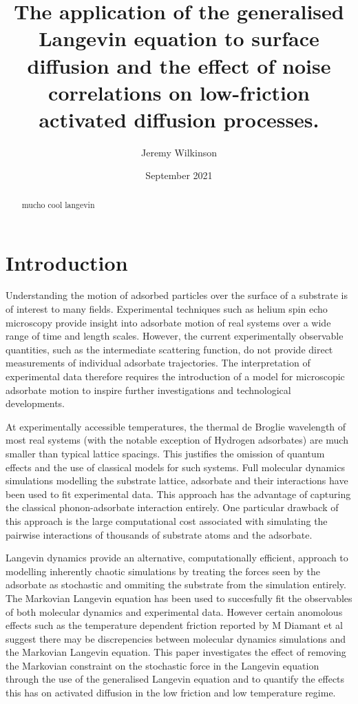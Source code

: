 \documentclass{article}
\title{The application of the generalised Langevin equation to surface diffusion and the effect of noise correlations on low-friction activated diffusion processes.}
\author{Jeremy Wilkinson}
\date{September 2021}
\begin{document}
\maketitle

\begin{abstract}
    mucho cool langevin
\end{abstract}

\tableofcontents

\section{Introduction}

Understanding the motion of adsorbed particles over the surface of a substrate is of interest to many fields. Experimental techniques such as helium spin echo microscopy provide insight into adsorbate motion of real systems over a wide range of time and length scales. However, the current experimentally observable quantities, such as the intermediate scattering function, do not provide direct measurements of individual adsorbate trajectories. The interpretation of experimental data therefore requires the introduction of a model for microscopic adsorbate motion to inspire further investigations and technological developments.

At experimentally accessible temperatures, the thermal de Broglie wavelength of most real systems (with the notable exception of Hydrogen adsorbates) are much smaller than typical lattice spacings. This justifies the omission of quantum effects and the use of classical models for such systems. Full molecular dynamics simulations modelling the substrate lattice, adsorbate and their interactions have been used to fit experimental data. This approach has the advantage of capturing the classical phonon-adsorbate interaction entirely. One particular drawback of this approach is the large computational cost associated with simulating the pairwise interactions of thousands of substrate atoms and the adsorbate. 

Langevin dynamics provide an alternative, computationally efficient, approach to modelling inherently chaotic simulations by treating the forces seen by the adsorbate as stochastic and ommiting the substrate from the simulation entirely. The Markovian Langevin equation has been used to succesfully fit the observables of both molecular dynamics and experimental data. However certain anomolous effects such as the temperature dependent friction reported by M Diamant et al suggest there may be discrepencies between molecular dynamics simulations and the Markovian Langevin equation. This paper investigates the effect of removing the Markovian constraint on the stochastic force in the Langevin equation through the use of the generalised Langevin equation and to quantify the effects this has on activated diffusion in the low friction and low temperature regime. 
\end{document}
